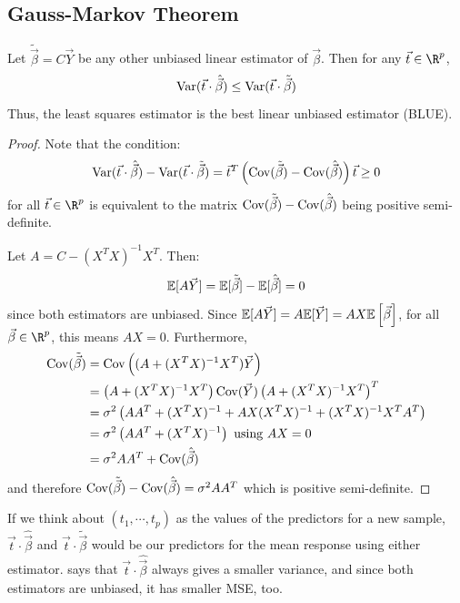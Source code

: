 \documentclass[../Main.tex]{subfiles}
\begin{document}
\subsection{Gauss-Markov Theorem}
\begin{theorem}
    Let $\tilde{\vec{\beta}} = C\vec{Y}$ be any other unbiased linear estimator of $\vec{\beta}$. Then for any $\vec{t} \in \R^p$,
    \begin{equation}
        \operatorname{Var}(\vec{t} \cdot \hat{\vec{\beta}}) \leq \operatorname{Var}(\vec{t} \cdot \tilde{\vec{\beta}})
        \label{eqnBLUE}
    \end{equation}
    Thus, the least squares estimator is the best linear unbiased estimator (BLUE).
    \label{thmGaussMarkov}
\end{theorem}
\begin{proof}
    Note that the condition:
    \begin{equation*}
        \operatorname{Var}(\vec{t} \cdot \hat{\vec{\beta}}) - \operatorname{Var}(\vec{t} \cdot \tilde{\vec{\beta}}) = \vec{t}^T \left(\operatorname{Cov}(\tilde{\vec{\beta}}) - \operatorname{Cov}(\hat{\vec{\beta}})\right) \vec{t} \geq 0
    \end{equation*}
    for all $\vec{t} \in \R^p$ is equivalent to the matrix $\operatorname{Cov}(\tilde{\vec{\beta}}) - \operatorname{Cov}(\hat{\vec{\beta}})$ being positive semi-definite.

    Let $A = C - (X^T X)^{-1} X^T$. Then:
    \begin{equation*}
        \mathbb{E}[A\vec{Y}] = \mathbb{E}[\tilde{\vec{\beta}}] - \mathbb{E}[\hat{\vec{\beta}}] = 0
    \end{equation*}
    since both estimators are unbiased. Since $\mathbb{E}[A\vec{Y}] = A \mathbb{E}[\vec{Y}] = AX\mathbb{E}\left[\vec{\beta}\right]$, for all $\vec{\beta} \in \R^p$, this means $AX = 0$. Furthermore,
    \begin{align*}
        \operatorname{Cov}(\tilde{\vec{\beta}}) &= \operatorname{Cov}\left((A + (X^T X)^{-1} X^T) \vec{Y}\right) \\
        &= \left(A + (X^T X)^{-1} X^T\right) \operatorname{Cov}(\vec{Y}) \left(A + (X^T X)^{-1} X^T\right)^T \\
        &= \sigma^2 \left(AA^T + (X^T X)^{-1} + AX(X^T X)^{-1} + (X^T X)^{-1} X^T A^T\right) \\
        &= \sigma^2 \left(AA^T + (X^T X)^{-1}\right) \text{ using $AX = 0$}\\
        &= \sigma^2 AA^T + \operatorname{Cov}(\hat{\vec{\beta}})
    \end{align*}
    and therefore $\operatorname{Cov}(\tilde{\vec{\beta}}) - \operatorname{Cov}(\hat{\vec{\beta}}) = \sigma^2 AA^T$ which is positive semi-definite.
\end{proof}
\begin{remark}
    If we think about $(t_1, \cdots, t_p)$ as the values of the predictors for a new sample, $\vec{t} \cdot \hat{\vec{\beta}}$ and $\vec{t} \cdot \tilde{\vec{\beta}}$ would be our predictors for the mean response using either estimator.  says that $\vec{t} \cdot \hat{\vec{\beta}}$ always gives a smaller variance, and since both estimators are unbiased, it has smaller MSE, too.
\end{remark}
\end{document}
